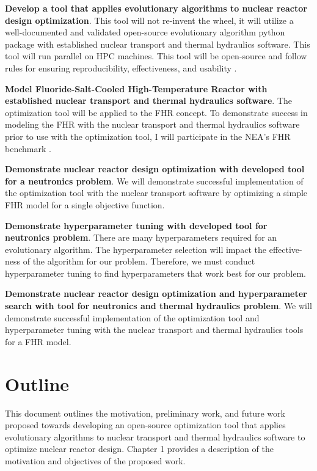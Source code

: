 \noindent
\textbf{Develop a tool that applies evolutionary algorithms to nuclear 
reactor design optimization}. 
This tool will not re-invent the wheel, it will utilize a well-documented 
and validated open-source evolutionary algorithm python package with established 
nuclear transport and thermal hydraulics software. This tool will run parallel on 
\gls{HPC} machines. This tool will be open-source and follow rules for ensuring 
reproducibility, effectiveness, and usability 
\cite{list_ten_2017,osborne_ten_2014,sandve_ten_2013}. 

\vspace{0.2cm} 
\noindent
\textbf{Model Fluoride-Salt-Cooled High-Temperature Reactor with established 
nuclear transport and thermal hydraulics software}.
The optimization tool will be applied to the \gls{FHR} concept. 
To demonstrate success in modeling the \gls{FHR} with the nuclear transport and 
thermal hydraulics software prior to use with the optimization tool, I will participate 
in the \gls{NEA}'s \gls{FHR} benchmark \cite{noauthor_fluoride_nodate}. 

\vspace{0.2cm} 
\noindent
\textbf{Demonstrate nuclear reactor design optimization with developed tool 
for a neutronics problem}. 
We will demonstrate successful implementation of the optimization tool with the 
nuclear transport software by optimizing a simple \gls{FHR} model for a single 
objective function. 

\vspace{0.2cm} 
\noindent
\textbf{Demonstrate hyperparameter tuning with developed tool for neutronics problem}.
There are many hyperparameters required for an evolutionary algorithm. 
The hyperparameter selection will impact the effective-ness of the algorithm 
for our problem. 
Therefore, we must conduct hyperparameter tuning to find hyperparameters that work 
best for our problem. 

\vspace{0.2cm} 
\noindent
\textbf{Demonstrate nuclear reactor design optimization and hyperparameter 
search with tool for neutronics and thermal hydraulics problem}.
We will demonstrate successful implementation of the optimization tool and 
hyperparameter tuning with the nuclear transport and thermal hydraulics tools 
for a \gls{FHR} model.  


\section{Outline}
This document outlines the motivation, preliminary work, and future work proposed 
towards developing an open-source optimization tool that applies evolutionary 
algorithms to nuclear transport and thermal hydraulics software to optimize 
nuclear reactor design. 
Chapter 1 provides a description of the motivation and objectives of the 
proposed work. 

